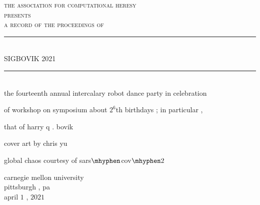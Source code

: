 \documentclass{article}
\begin{document}
\setmainfont{Splotch.ttf}
\setsansfont{Birbaslo.ttf}

\newcommand{\HRule}{\rule{\linewidth}{0.5mm}}

\begin{titlepage}
\begin{center}

\textsc{\LARGE the association for computational heresy}\\[0.5cm]

\textsc{\large presents}\\[1cm]

\textsc{\Large a record of the proceedings of}\\[0.5cm]
\HRule \\[0.4cm]
{ \Huge \sf SIGBOVIK 2021 \\[0.4cm] }

\HRule \\[2cm]


the fourteenth annual intercalary robot dance party in celebration

of workshop on symposium about $2^6$th birthdays{ ;} in particular{ ,}

that of harry q{ .} bovik

\vfill

cover art by chris yu

global chaos courtesy of sars$\mhyphen$cov$\mhyphen 2$

\vfill

{\Large carnegie mellon university\\[0.25cm]
pittsburgh{ ,} pa\\[0.3cm]
april $1${ ,} $2021$}

\end{center}
\end{titlepage}
\end{document}
